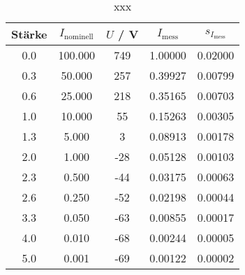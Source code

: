 \begin{table}[H]
\caption{xxx}
\begin{center}
\begin{tabular}{|c|c|c|c|c|}
  \hline
  Stärke & $I_\text{nominell}$ & $U$ / V & $I_\text{mess}$ & $s_{I_\text{mess}}$ \\ \hline
  0.0 & 100.000 & 749 & 1.00000 & 0.02000 \\ \hline
  0.3 & 50.000 & 257 & 0.39927 & 0.00799 \\ \hline
  0.6 & 25.000 & 218 & 0.35165 & 0.00703 \\ \hline
  1.0 & 10.000 & 55 & 0.15263 & 0.00305 \\ \hline
  1.3 & 5.000 & 3 & 0.08913 & 0.00178 \\ \hline
  2.0 & 1.000 & -28 & 0.05128 & 0.00103 \\ \hline
  2.3 & 0.500 & -44 & 0.03175 & 0.00063 \\ \hline
  2.6 & 0.250 & -52 & 0.02198 & 0.00044 \\ \hline
  3.3 & 0.050 & -63 & 0.00855 & 0.00017 \\ \hline
  4.0 & 0.010 & -68 & 0.00244 & 0.00005 \\ \hline
  5.0 & 0.001 & -69 & 0.00122 & 0.00002 \\ \hline
\end{tabular}
\end{center}
\label{tab:deh:dnfilter}
\end{table}
